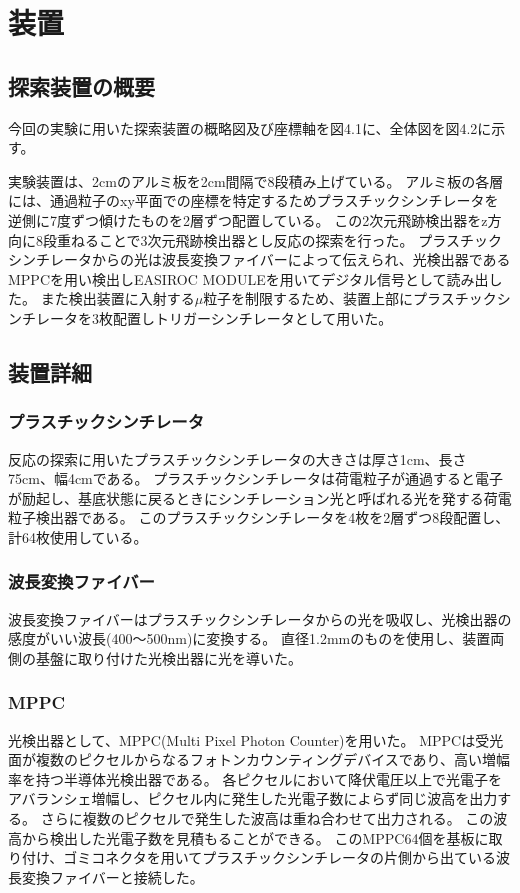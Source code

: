 \chapter{装置} \label{equipment}
\section{探索装置の概要}
今回の実験に用いた探索装置の概略図及び座標軸を図4.1に、全体図を図4.2に示す。

実験装置は、2cmのアルミ板を2cm間隔で8段積み上げている。
アルミ板の各層には、通過粒子のxy平面での座標を特定するためプラスチックシンチレータを逆側に7度ずつ傾けたものを2層ずつ配置している。
この2次元飛跡検出器をz方向に8段重ねることで3次元飛跡検出器とし反応の探索を行った。
プラスチックシンチレータからの光は波長変換ファイバーによって伝えられ、光検出器であるMPPCを用い検出しEASIROC MODULEを用いてデジタル信号として読み出した。
また検出装置に入射する$\mu$粒子を制限するため、装置上部にプラスチックシンチレータを3枚配置しトリガーシンチレータとして用いた。

\section{装置詳細}
\subsection{プラスチックシンチレータ}
反応の探索に用いたプラスチックシンチレータの大きさは厚さ1cm、長さ75cm、幅4cmである。
プラスチックシンチレータは荷電粒子が通過すると電子が励起し、基底状態に戻るときにシンチレーション光と呼ばれる光を発する荷電粒子検出器である。
このプラスチックシンチレータを4枚を2層ずつ8段配置し、計64枚使用している。

\subsection{波長変換ファイバー}
波長変換ファイバーはプラスチックシンチレータからの光を吸収し、光検出器の感度がいい波長(400～500nm)に変換する。
直径1.2mmのものを使用し、装置両側の基盤に取り付けた光検出器に光を導いた。

\subsection{MPPC}
光検出器として、MPPC(Multi Pixel Photon Counter)を用いた。
MPPCは受光面が複数のピクセルからなるフォトンカウンティングデバイスであり、高い増幅率を持つ半導体光検出器である。
各ピクセルにおいて降伏電圧以上で光電子をアバランシェ増幅し、ピクセル内に発生した光電子数によらず同じ波高を出力する。
さらに複数のピクセルで発生した波高は重ね合わせて出力される。
この波高から検出した光電子数を見積もることができる。
このMPPC64個を基板に取り付け、ゴミコネクタを用いてプラスチックシンチレータの片側から出ている波長変換ファイバーと接続した。

